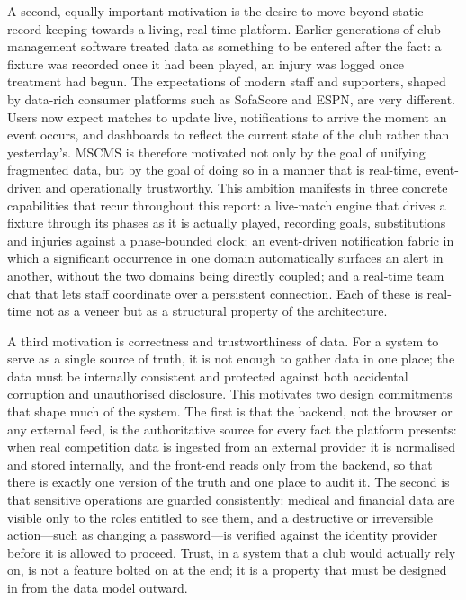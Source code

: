 A second, equally important motivation is the desire to move beyond static record-keeping
towards a living, real-time platform. Earlier generations of club-management software
treated data as something to be entered after the fact: a fixture was recorded once it had
been played, an injury was logged once treatment had begun. The expectations of modern
staff and supporters, shaped by data-rich consumer platforms such as SofaScore and ESPN,
are very different. Users now expect matches to update live, notifications to arrive the
moment an event occurs, and dashboards to reflect the current state of the club rather than
yesterday's. MSCMS is therefore motivated not only by the goal of unifying fragmented
data, but by the goal of doing so in a manner that is real-time, event-driven and
operationally trustworthy. This ambition manifests in three concrete capabilities that recur
throughout this report: a live-match engine that drives a fixture through its phases as it is
actually played, recording goals, substitutions and injuries against a phase-bounded clock;
an event-driven notification fabric in which a significant occurrence in one domain
automatically surfaces an alert in another, without the two domains being directly coupled;
and a real-time team chat that lets staff coordinate over a persistent connection. Each of
these is real-time not as a veneer but as a structural property of the architecture.

A third motivation is correctness and trustworthiness of data. For a system to serve as a
single source of truth, it is not enough to gather data in one place; the data must be
internally consistent and protected against both accidental corruption and unauthorised
disclosure. This motivates two design commitments that shape much of the system. The first
is that the backend, not the browser or any external feed, is the authoritative source for
every fact the platform presents: when real competition data is ingested from an external
provider it is normalised and stored internally, and the front-end reads only from the
backend, so that there is exactly one version of the truth and one place to audit it. The
second is that sensitive operations are guarded consistently: medical and financial data are
visible only to the roles entitled to see them, and a destructive or irreversible action---such
as changing a password---is verified against the identity provider before it is allowed to
proceed. Trust, in a system that a club would actually rely on, is not a feature bolted on at
the end; it is a property that must be designed in from the data model outward.

